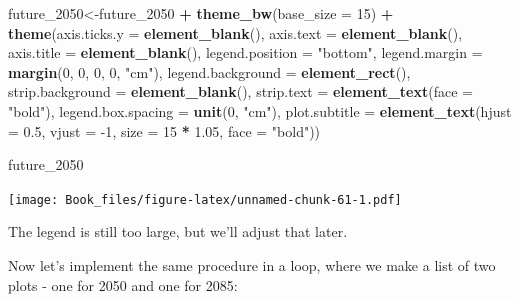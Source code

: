 \documentclass[
]{book}
\newenvironment{Shaded}{\begin{snugshade}}{\end{snugshade}}
\newcommand{\DataTypeTok}[1]{\textcolor[rgb]{0.13,0.29,0.53}{#1}}
\newcommand{\DecValTok}[1]{\textcolor[rgb]{0.00,0.00,0.81}{#1}}
\newcommand{\FloatTok}[1]{\textcolor[rgb]{0.00,0.00,0.81}{#1}}
\newcommand{\KeywordTok}[1]{\textcolor[rgb]{0.13,0.29,0.53}{\textbf{#1}}}
\newcommand{\NormalTok}[1]{#1}
\newcommand{\OperatorTok}[1]{\textcolor[rgb]{0.81,0.36,0.00}{\textbf{#1}}}
\newcommand{\StringTok}[1]{\textcolor[rgb]{0.31,0.60,0.02}{#1}}
\begin{document}
\begin{Shaded}
\begin{Highlighting}[]
\NormalTok{future_}\DecValTok{2050}\NormalTok{<-future_}\DecValTok{2050} \OperatorTok{+}
\StringTok{  }\KeywordTok{theme_bw}\NormalTok{(}\DataTypeTok{base_size =} \DecValTok{15}\NormalTok{) }\OperatorTok{+}
\StringTok{  }\KeywordTok{theme}\NormalTok{(}\DataTypeTok{axis.ticks.y =} \KeywordTok{element_blank}\NormalTok{(),}
        \DataTypeTok{axis.text =} \KeywordTok{element_blank}\NormalTok{(),}
        \DataTypeTok{axis.title =} \KeywordTok{element_blank}\NormalTok{(),}
                 \DataTypeTok{legend.position =} \StringTok{"bottom"}\NormalTok{,}
                 \DataTypeTok{legend.margin =} \KeywordTok{margin}\NormalTok{(}\DecValTok{0}\NormalTok{, }\DecValTok{0}\NormalTok{, }\DecValTok{0}\NormalTok{, }\DecValTok{0}\NormalTok{, }\StringTok{"cm"}\NormalTok{),}
                 \DataTypeTok{legend.background =} \KeywordTok{element_rect}\NormalTok{(),}
                 \DataTypeTok{strip.background =} \KeywordTok{element_blank}\NormalTok{(),}
                 \DataTypeTok{strip.text =} \KeywordTok{element_text}\NormalTok{(}\DataTypeTok{face =} \StringTok{"bold"}\NormalTok{),}
                 \DataTypeTok{legend.box.spacing =} \KeywordTok{unit}\NormalTok{(}\DecValTok{0}\NormalTok{, }\StringTok{"cm"}\NormalTok{),}
                 \DataTypeTok{plot.subtitle =} \KeywordTok{element_text}\NormalTok{(}\DataTypeTok{hjust =} \FloatTok{0.5}\NormalTok{, }\DataTypeTok{vjust =} \DecValTok{-1}\NormalTok{, }\DataTypeTok{size =} \DecValTok{15} \OperatorTok{*}\StringTok{ }\FloatTok{1.05}\NormalTok{,}
                                                       \DataTypeTok{face =} \StringTok{"bold"}\NormalTok{)) }

\NormalTok{future_}\DecValTok{2050}
\end{Highlighting}
\end{Shaded}

\texttt{[image: Book\_files/figure-latex/unnamed-chunk-61-1.pdf]}

The legend is still too large, but we'll adjust that later.

Now let's implement the same procedure in a loop, where we make a list of two plots - one for 2050 and one for 2085:
\end{document}
